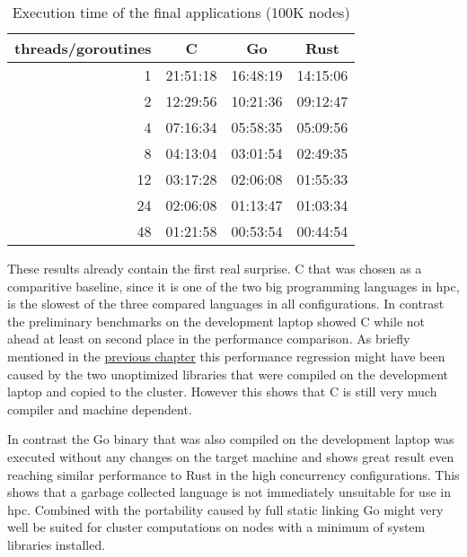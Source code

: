 \begin{table}[htb]
    \centering
    \begin{tabular}{rccc}
        \toprule
            threads/goroutines
            & C
            & Go
            & Rust \\
        \midrule

            1
            & 21:51:18
            & 16:48:19
            & 14:15:06 \\

            2
            & 12:29:56
            & 10:21:36
            & 09:12:47 \\

            4
            & 07:16:34
            & 05:58:35
            & 05:09:56 \\

            8
            & 04:13:04
            & 03:01:54
            & 02:49:35 \\

            12
            & 03:17:28
            & 02:06:08
            & 01:55:33 \\

            24
            & 02:06:08
            & 01:13:47
            & 01:03:34 \\

            48
            & 01:21:58
            & 00:53:54
            & 00:44:54 \\

        \bottomrule
    \end{tabular}
    \caption{Execution time of the final applications (100K nodes)}
    \label{tb:final_execution_time}
\end{table}

These results already contain the first real surprise. C that was chosen as a comparitive baseline, since it is one of the two big programming languages in \gls{hpc}, is the slowest of the three compared languages in all configurations. In contrast the preliminary benchmarks on the development laptop showed C while not ahead at least on second place in the performance comparison. As briefly mentioned in the \hyperref[subsec:Implementation::ClusterPreparation::C]{previous chapter} this performance regression might have been caused by the two unoptimized libraries that were compiled on the development laptop and copied to the cluster. However this shows that C is still very much compiler and machine dependent.

In contrast the Go binary that was also compiled on the development laptop was executed without any changes on the target machine and shows great result even reaching similar performance to Rust in the high concurrency configurations. This shows that a garbage collected language is not immediately unsuitable for use in \gls{hpc}. Combined with the portability caused by full static linking Go might very well be suited for cluster computations on nodes with a minimum of system libraries installed.

